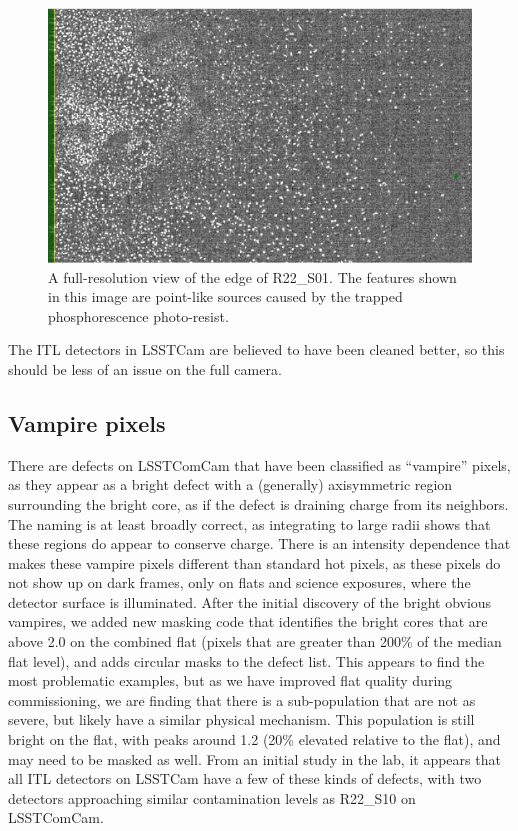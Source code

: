 \begin{figure}
  \begin{center}
  \includegraphics[width=\textwidth]{figures/isr-f02-phosphorescence_point_like.pdf}
  \caption{A full-resolution view of the edge of R22\_S01.  The features shown in this image are point-like sources caused by the trapped phosphorescence photo-resist.}
  \end{center}
\end{figure}

The ITL detectors in LSSTCam are believed to have been cleaned better, so this should be less of an issue on the full camera.

\subsection{Vampire pixels}

There are defects on LSSTComCam that have been classified as ``vampire'' pixels, as they appear as a bright defect with a (generally) axisymmetric region surrounding the bright core, as if the defect is draining charge from its neighbors.
The naming is at least broadly correct, as integrating to large radii shows that these regions do appear to conserve charge.
There is an intensity dependence that makes these vampire pixels different than standard hot pixels, as these pixels do not show up on dark frames, only on flats and science exposures, where the detector surface is illuminated.
After the initial discovery of the bright obvious vampires, we added new masking code that identifies the bright cores that are above 2.0 on the combined flat (pixels that are greater than 200\% of the median flat level), and adds circular masks to the defect list.
This appears to find the most problematic examples, but as we have improved flat quality during commissioning, we are finding that there is a sub-population that are not as severe, but likely have a similar physical mechanism.
This population is still bright on the flat, with peaks around 1.2 (20\% elevated relative to the flat), and may need to be masked as well.
From an initial study in the lab, it appears that all ITL detectors on LSSTCam have a few of these kinds of defects, with two detectors approaching similar contamination levels as R22\_S10 on LSSTComCam.

